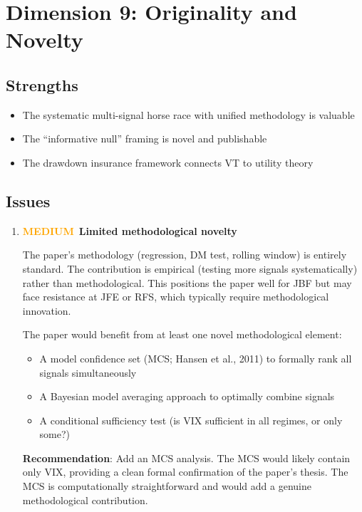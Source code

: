 \documentclass[12pt,a4paper]{article}
\newcommand{\MEDIUM}{\textcolor{orange}{\textbf{MEDIUM}}}
\begin{document}
\section{Dimension 9: Originality and Novelty}
\label{sec:d9}

\subsection*{Strengths}
\begin{itemize}
    \item The systematic multi-signal horse race with unified methodology is valuable
    \item The ``informative null'' framing is novel and publishable
    \item The drawdown insurance framework connects VT to utility theory
\end{itemize}

\subsection*{Issues}

\begin{enumerate}[label=D9.\arabic*]

\item \MEDIUM\ \textbf{Limited methodological novelty}

The paper's methodology (regression, DM test, rolling window) is entirely standard. The contribution is empirical (testing more signals systematically) rather than methodological. This positions the paper well for JBF but may face resistance at JFE or RFS, which typically require methodological innovation.

The paper would benefit from at least one novel methodological element:
\begin{itemize}
    \item A model confidence set (MCS; Hansen et al., 2011) to formally rank all signals simultaneously
    \item A Bayesian model averaging approach to optimally combine signals
    \item A conditional sufficiency test (is VIX sufficient in all regimes, or only some?)
\end{itemize}
\textbf{Recommendation}: Add an MCS analysis. The MCS would likely contain only VIX, providing a clean formal confirmation of the paper's thesis. The MCS is computationally straightforward and would add a genuine methodological contribution.

\end{enumerate}
\end{document}
